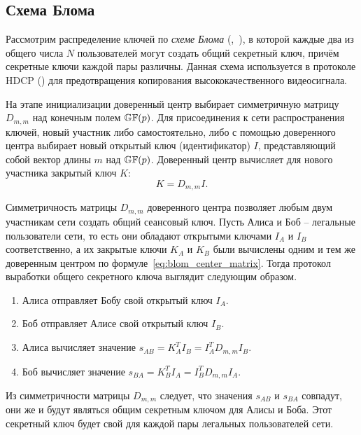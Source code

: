 \subsection{Схема Блома}\label{section-bloms-scheme}

Рассмотрим распределение ключей по \emph{схеме Блома} (,~\cite{Blom:1984, Blom:1985}), в которой каждые два  из общего числа $N$ пользователей могут создать общий секретный ключ, причём секретные ключи каждой пары различны. Данная схема используется в протоколе HDCP () для предотвращения копирования высококачественного видеосигнала.

На этапе инициализации доверенный центр выбирает симметричную матрицу $D_{m,m}$ над конечным полем $\mathbb{GF}(p)$. Для присоединения к сети распространения ключей, новый участник либо самостоятельно, либо с помощью доверенного центра выбирает новый открытый ключ (идентификатор) $I$, представляющий собой вектор длины $m$ над $\mathbb{GF}(p)$. Доверенный центр вычисляет для нового участника закрытый ключ $K$:
\begin{equation}
	K = D_{m,m} I.
	\label{eq:blom_center_matrix}
\end{equation}

Симметричность матрицы $D_{m,m}$ доверенного центра позволяет любым двум участникам сети создать общий сеансовый ключ. Пусть Алиса и Боб -- легальные пользователи сети, то есть они обладают открытыми ключами $I_A$ и $I_B$ соответственно, а их закрытые ключи $K_A$ и $K_B$ были вычислены одним и тем же доверенным центром по формуле~\ref{eq:blom_center_matrix}. Тогда протокол выработки общего секретного ключа выглядит следующим образом.

\begin{enumerate}
	\item Алиса отправляет Бобу свой открытый ключ $I_A$.
	\item Боб отправляет Алисе свой открытый ключ $I_B$.
	\item Алиса вычисляет значение $s_{AB} = K^T_A I_B = I^T_A D_{m,m} I_B$.
	\item Боб вычисляет значение $s_{BA} = K^T_B I_A = I^T_B D_{m,m} I_A$.
\end{enumerate}

Из симметричности матрицы $D_{m,m}$ следует, что значения $s_{AB}$ и $s_{BA}$ совпадут, они же и будут являться общим секретным ключом для Алисы и Боба. Этот секретный ключ будет свой для каждой пары легальных пользователей сети.

